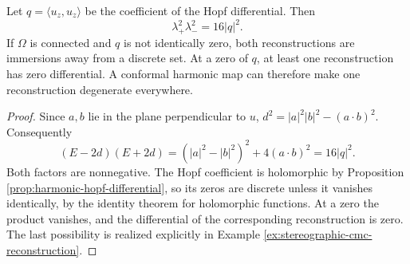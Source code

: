 \begin{proposition}\label{prop:cmc-reconstruction-hopf}
Let $q=\langle u_z,u_z\rangle$ be the coefficient of the Hopf differential. Then
\[
 \lambda_+^2\lambda_-^2=16|q|^2.
\]
If $\Omega$ is connected and $q$ is not identically zero, both reconstructions are immersions away from a discrete set. At a zero of $q$, at least one reconstruction has zero differential. A conformal harmonic map can therefore make one reconstruction degenerate everywhere.
\end{proposition}
\begin{proof}
Since $a,b$ lie in the plane perpendicular to $u$, $d^2=|a|^2|b|^2-(a\cdot b)^2$. Consequently
\[
 (E-2d)(E+2d)=(|a|^2-|b|^2)^2+4(a\cdot b)^2=16|q|^2.
\]
Both factors are nonnegative. The Hopf coefficient is holomorphic by Proposition \ref{prop:harmonic-hopf-differential}, so its zeros are discrete unless it vanishes identically, by the identity theorem for holomorphic functions. At a zero the product vanishes, and the differential of the corresponding reconstruction is zero. The last possibility is realized explicitly in Example \ref{ex:stereographic-cmc-reconstruction}.
\end{proof}
